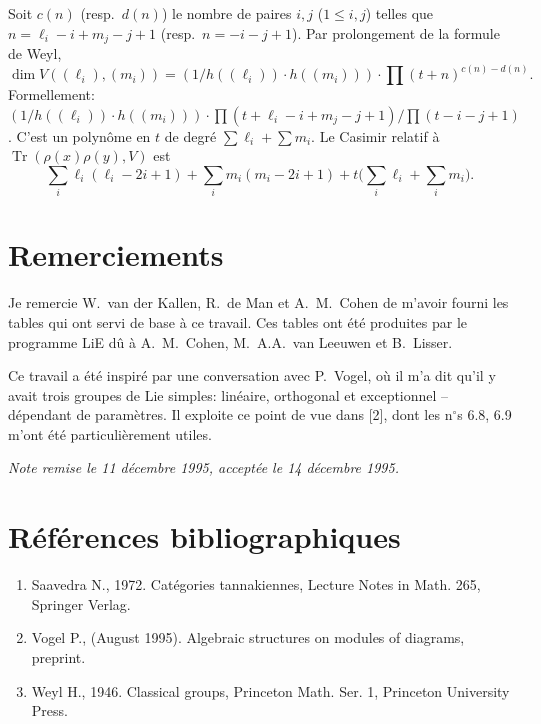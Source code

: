 \documentclass[11pt,a4paper]{article}
\DeclareMathOperator{\Tr}{Tr}
\begin{document}
Soit $c(n)$ (resp.~$d(n)$) le nombre de paires $i, j$ ($1 \leq i, j$) telles que $n = \ell_i - i + m_j - j + 1$ (resp.~$n = -i - j + 1$). Par prolongement de la formule de Weyl,
$$
\dim V((\ell_i), (m_i)) = (1/h((\ell_i)) \cdot h((m_i))) \cdot \prod (t + n)^{c(n) - d(n)}.
$$
Formellement: $(1/h((\ell_i)) \cdot h((m_i))) \cdot \prod (t + \ell_i - i + m_j - j + 1) / \prod (t - i - j + 1)$. C'est un polyn\^ome en $t$ de degr\'e $\sum \ell_i + \sum m_i$. Le Casimir relatif \`a $\Tr(\rho(x)\rho(y), V)$ est
$$
\sum_i \ell_i(\ell_i - 2i + 1) + \sum_i m_i(m_i - 2i + 1) + t\bigl(\sum_i \ell_i + \sum_i m_i\bigr).
$$

\section*{Remerciements}

Je remercie W.~van der Kallen, R.~de Man et A.~M.~Cohen de m'avoir fourni les tables qui ont servi de base \`a ce travail. Ces tables ont \'et\'e produites par le programme LiE d\^u \`a A.~M.~Cohen, M.~A.A.~van Leeuwen et B.~Lisser.

Ce travail a \'et\'e inspir\'e par une conversation avec P.~Vogel, o\`u il m'a dit qu'il y avait trois groupes de Lie simples: lin\'eaire, orthogonal et exceptionnel -- d\'ependant de param\`etres. Il exploite ce point de vue dans [2], dont les n$^\circ$s 6.8, 6.9 m'ont \'et\'e particuli\`erement utiles.

\smallskip
\noindent\textit{Note remise le 11 d\'ecembre 1995, accept\'ee le 14 d\'ecembre 1995.}

\section*{R\'ef\'erences bibliographiques}

\begin{enumerate}
\item[{[1]}] Saavedra N., 1972. Cat\'egories tannakiennes, Lecture Notes in Math. 265, Springer Verlag.

\item[{[2]}] Vogel P., (August 1995). Algebraic structures on modules of diagrams, preprint.

\item[{[3]}] Weyl H., 1946. Classical groups, Princeton Math. Ser. 1, Princeton University Press.
\end{enumerate}
\end{document}
